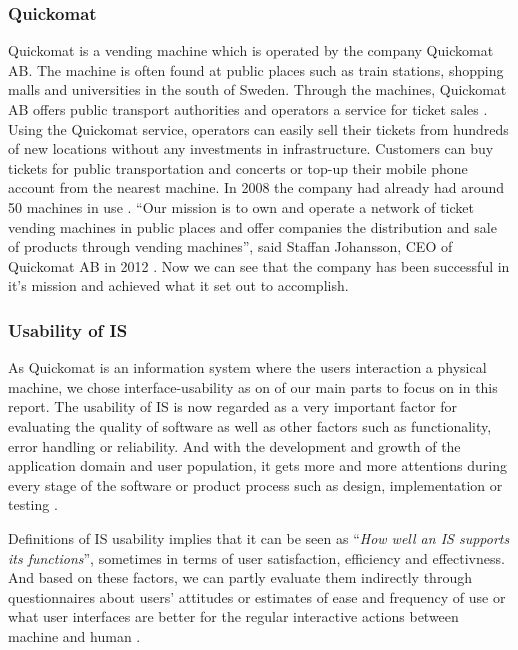 \documentclass[twocolumn]{article}
\begin{document}
\subsubsection{Quickomat}
Quickomat is a vending machine which is operated by the company Quickomat AB. The machine is often found at public places such as train stations, shopping malls and universities in the south of Sweden. Through the machines, Quickomat AB offers public transport authorities and operators a service for ticket sales \citep{QuickomatAB2014}.
    Using the Quickomat service, operators can easily sell their tickets from hundreds of new locations without any investments in infrastructure. Customers can buy tickets for public transportation and concerts or top-up their mobile phone account from the nearest machine. In 2008 the company had already had around 50 machines in use \citep{RealDeals2008}.  “Our mission is to own and operate a network of ticket vending machines in public places and offer companies the distribution and sale of products through vending machines”, said Staffan Johansson, CEO of Quickomat AB in 2012 \citep{Svanberg2012}. Now we can see that the company has been successful in it's mission and achieved what it set out to accomplish.

\subsubsection{Usability of IS}
As Quickomat is an information system where the users interaction a physical machine, we chose interface-usability as on of our main parts to focus on in this report. The usability of IS is now regarded as a very important factor for evaluating the quality of software as well as other factors such as functionality, error handling or reliability. And with the development and growth of the application domain and user population, it gets more and more attentions during every stage of the software or product process such as design, implementation or testing \citep{Zhang1996}.

Definitions of IS usability implies that it can be seen as  “\emph{How well an IS supports its functions}”, sometimes in terms of user satisfaction, efficiency and effectivness. And based on these factors, we can partly evaluate them indirectly through questionnaires about users’ attitudes or estimates of ease and frequency of use or what user interfaces are better for the regular interactive actions between machine and human \citep{walldius2012}.
\end{document}
